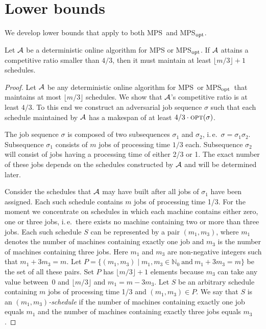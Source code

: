 \documentclass{llncs}
\newcommand{\OPT}{\text{{\sc opt}}}
\newcommand{\opt}{\OPT}
\newcommand{\MPS}{{\rm MPS}}
\newcommand{\MPSO}{{\rm MPS$_{\rm opt}$}}
\begin{document}
\section{Lower bounds}\label{sec:lb}
We develop lower bounds that apply  to both \MPS\ and \MPSO. 
\begin{theorem}\label{th:lb1}
Let ${\cal A}$ be a deterministic online algorithm for MPS or MPS$_{\rm opt}$. If ${\cal A}$ attains a competitive 
ratio smaller than $4/3$, then it must maintain at least $\lfloor m/3\rfloor +1$ schedules.
\end{theorem}
\begin{proof}
Let ${\cal A}$ be any deterministic online algorithm for \MPS\ or \MPSO\ that maintains at most $\lfloor m/3\rfloor$
schedules. We show that ${\cal A}$'s competitive ratio is at least $4/3$. To this end we construct an 
adversarial job sequence $\sigma$ such that each schedule maintained by ${\cal A}$ has a makespan
of at least $4/3\cdot \opt(\sigma)$. 

The job sequence $\sigma$ is composed of two subsequences $\sigma_1$ and $\sigma_2$, i.\,e.\
$\sigma = \sigma_1 \sigma_2$. Subsequence $\sigma_1$ consists of $m$ jobs of processing time
$1/3$ each. Subsequence $\sigma_2$ will consist of jobs having a processing time of either
2/3 or 1. The exact number of these jobs depends on the schedules constructed by ${\cal A}$ and 
will be determined later.

Consider the schedules that ${\cal A}$ may have built after all jobs of $\sigma_1$ have been
assigned. Each such schedule contains $m$ jobs of processing time 1/3. For the moment we concentrate on 
schedules in which each machine contains either zero, one or three jobs, i.\,e.\ there exists no machine 
containing two or more than three jobs. Each such schedule $S$ can be represented by a pair $(m_1,m_3)$, 
where $m_1$ denotes the number of machines containing exactly one job and $m_3$ is the number of machines 
containing three jobs. Here $m_1$ and $m_3$ are non-negative integers such that $m_1 + 3m_3 = m$. Let
$P = \{(m_1,m_3) \mid m_1,m_3\in \mathbb{N}_0 \ \mbox{and}\ m_1+3m_3 = m\}$ be the set of all
these pairs. Set $P$ has $\lfloor m/3\rfloor +1$ elements because $m_3$ can take any value
between~0 and $\lfloor m/3\rfloor$ and $m_1 = m - 3m_3$. Let $S$ be an arbitrary schedule 
containing $m$ jobs of processing time 1/3 and $(m_1,m_3)\in P$. We say that $S$ is an 
{\em $(m_1,m_3)$-schedule} if the number of machines containing exactly one job equals $m_1$ and 
the number of machines containing exactly three jobs equals $m_3$. 


\end{proof}
\end{document}
